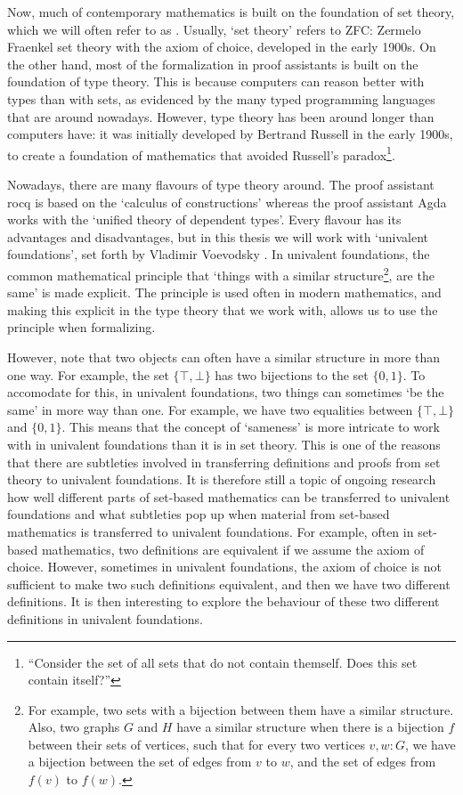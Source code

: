 Now, much of contemporary mathematics is built on the foundation of set theory, which we will often refer to as . Usually, `set theory' refers to ZFC: Zermelo Fraenkel set theory with the axiom of choice, developed in the early 1900s. On the other hand, most of the formalization in proof assistants is built on the foundation of type theory. This is because computers can reason better with types than with sets, as evidenced by the many typed programming languages that are around nowadays. However, type theory has been around longer than computers have: it was initially developed by Bertrand Russell in the early 1900s, to create a foundation of mathematics that avoided Russell's paradox\footnote{``Consider the set of all sets that do not contain themself. Does this set contain itself?''}.

Nowadays, there are many flavours of type theory around. The proof assistant rocq is based on the `calculus of constructions' whereas the proof assistant Agda works with the `unified theory of dependent types'. Every flavour has its advantages and disadvantages, but in this thesis we will work with `univalent foundations', set forth by Vladimir Voevodsky \autocite{voevodsky-univalent-foundations}. In univalent foundations, the common mathematical principle that `things with a similar structure\footnote{For example, two sets with a bijection between them have a similar structure. Also, two graphs $ G $ and $ H $ have a similar structure when there is a bijection $ f $ between their sets of vertices, such that for every two vertices $ v, w : G $, we have a bijection between the set of edges from $ v $ to $ w $, and the set of edges from $ f(v) $ to $ f(w) $.}, are the same' is made explicit. The principle is used often in modern mathematics, and making this explicit in the type theory that we work with, allows us to use the principle when formalizing.

However, note that two objects can often have a similar structure in more than one way. For example, the set $ \{ \top, \bot \} $ has two bijections to the set $ \{ 0, 1 \} $. To accomodate for this, in univalent foundations, two things can sometimes `be the same' in more way than one. For example, we have two equalities between $ \{ \top, \bot \} $ and $ \{ 0, 1 \} $. This means that the concept of `sameness' is more intricate to work with in univalent foundations than it is in set theory. This is one of the reasons that there are subtleties involved in transferring definitions and proofs from set theory to univalent foundations. It is therefore still a topic of ongoing research how well different parts of set-based mathematics can be transferred to univalent foundations and what subtleties pop up when material from set-based mathematics is transferred to univalent foundations. For example, often in set-based mathematics, two definitions are equivalent if we assume the axiom of choice. However, sometimes in univalent foundations, the axiom of choice is not sufficient to make two such definitions equivalent, and then we have two different definitions. It is then interesting to explore the behaviour of these two different definitions in univalent foundations.

